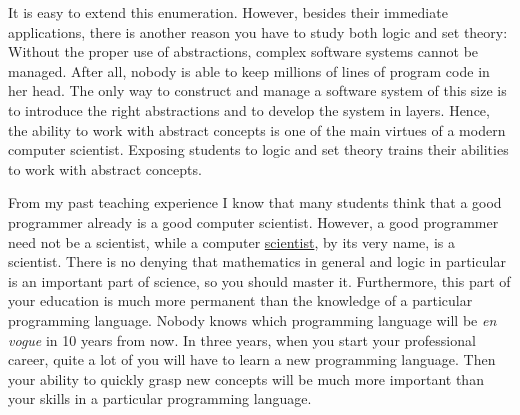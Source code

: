 It is easy to extend this enumeration.  However, besides their immediate applications, 
there is another reason you have to study both logic and set theory: Without the proper use of
{\color{blue}abstractions}, complex software systems cannot be managed.  After all, nobody is able to keep
millions of lines of program code in her head.  The only way to construct and manage a software system of this
size is to introduce the right abstractions and to develop the system in layers.  Hence, the ability
to work with abstract concepts is one of the main virtues of a modern computer scientist.  
Exposing students to logic and set theory trains their abilities to work with abstract concepts.

From my past teaching experience I know that many students think that a good programmer already is a
good computer scientist.  However, a good programmer need not be a scientist, while a 
{\color{blue}computer \underline{scientist}}, by its very name, is a
{\color{blue}scientist}.  There is no denying that {\color{blue}mathematics} in general and 
{\color{blue}logic} in particular is an important part of science, so you should master it.  Furthermore, this
part of your education is much more permanent than the knowledge of a particular programming
language.  Nobody knows which programming language will be \emph{en vogue} in 10 years from now.  In three 
years, when you start your professional career, quite a lot of you will have to learn a new
programming language.   Then your ability to quickly grasp new concepts will be much more important than your
skills in a particular programming language. 


